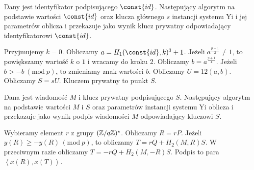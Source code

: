 \begin{algorithm}
Dany jest identyfikator podpisującego $\const{id}$.
Następujący algorytm na podstawie wartości $\const{id}$
oraz klucza głównego $s$ instancji systemu Yi i jej parametrów
oblicza i przekazuje jako wynik
klucz prywatny odpowiadający identyfikatorowi $\const{id}$.

\begin{codebox}
\li
Przyjmujemy $k = 0$.
\li
Obliczamy $a = H_1(\const{id}, k)^3 + 1$.
\li
Jeżeli $a^{\frac{p-1}{2}} \neq 1$, to powiększamy wartość $k$ o $1$ i wracamy do kroku 2.
\li
Obliczamy $b = a^{\frac{p+1}{4}}$.
\li
Jeżeli $b > -b\ (\text{mod}\ p)$, to zmieniamy znak wartości $b$.
\li
Obliczamy $U = 12(a, b)$.
\li
Obliczamy $S = sU$.
\li
Kluczem prywatny to punkt $S$.
\end{codebox}
\end{algorithm}

\begin{algorithm}
Dana jest wiadomość $M$
i klucz prywatny podpisującego $S$.
Następujący algorytm na podstawie wartości $M$ i $S$
oraz parametrów instancji systemu Yi
oblicza i przekazuje jako wynik
podpis wiadomości $M$ odpowiadający kluczowi $S$.

\begin{codebox}
\li
Wybieramy element $r$ z grupy $(\mathbb{Z}/q\mathbb{Z})^\star$.
\li
Obliczamy $R = rP$.
\li
Jeżeli $y(R) \geq -y(R)\ (\text{mod}\ p)$,
to obliczamy $T = rQ + H_2(M, R)S$.
\li
W przeciwnym razie obliczamy $T = -rQ + H_2(M, -R)S$.
\li
Podpis to para $\left\langle x(R), x(T) \right\rangle$.
\end{codebox}
\end{algorithm}

